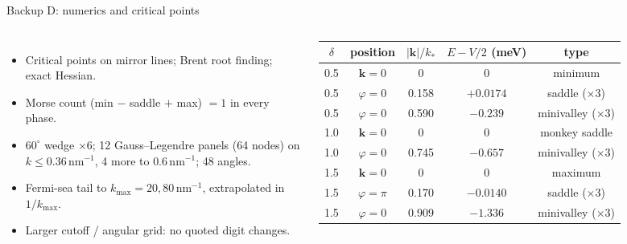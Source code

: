 \documentclass[aspectratio=169,11pt]{beamer}
\newcommand{\bk}{\mathbf{k}}
\newcommand{\nm}{\,\mathrm{nm}}
\begin{document}
\begin{frame}{Backup D: numerics and critical points}
\begin{columns}[T]
\footnotesize
\begin{itemize}\setlength{\itemsep}{4pt}
\item Critical points on mirror lines; Brent root finding; exact Hessian.
\item Morse count (min $-$ saddle $+$ max) $=1$ in every phase.
\item $60^\circ$ wedge $\times6$; 12 Gauss--Legendre panels (64 nodes) on $k\le0.36\nm^{-1}$, 4 more to $0.6\nm^{-1}$; 48 angles.
\item Fermi-sea tail to $k_{\max}=20,80\nm^{-1}$, extrapolated in $1/k_{\max}$.
\item Larger cutoff / angular grid: no quoted digit changes.
\end{itemize}
\scriptsize
\begin{tabular}{ccccc}
\toprule
$\delta$ & position & $|\bk|/k_*$ & $E-V/2$ (meV) & type\\
\midrule
0.5 & $\bk=0$ & 0 & 0 & minimum\\
0.5 & $\varphi=0$ & 0.158 & $+0.0174$ & saddle ($\times3$)\\
0.5 & $\varphi=0$ & 0.590 & $-0.239$ & minivalley ($\times3$)\\
1.0 & $\bk=0$ & 0 & 0 & monkey saddle\\
1.0 & $\varphi=0$ & 0.745 & $-0.657$ & minivalley ($\times3$)\\
1.5 & $\bk=0$ & 0 & 0 & maximum\\
1.5 & $\varphi=\pi$ & 0.170 & $-0.0140$ & saddle ($\times3$)\\
1.5 & $\varphi=0$ & 0.909 & $-1.336$ & minivalley ($\times3$)\\
\bottomrule
\end{tabular}
\end{columns}
\end{frame}
\end{document}
